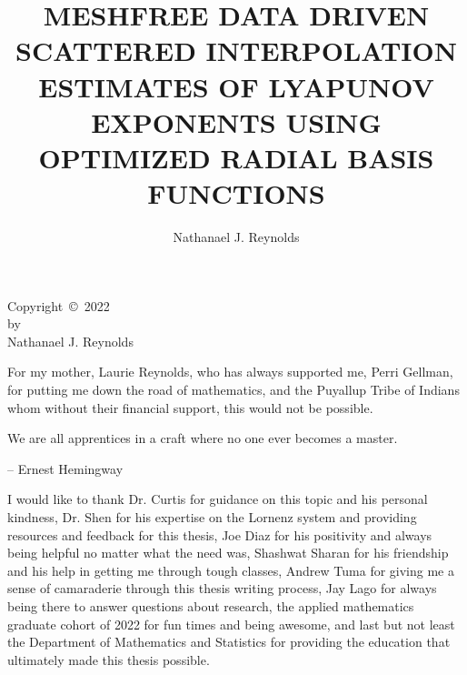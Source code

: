 \documentclass[12pt]{sdsu-thesis}
\author{Nathanael J. Reynolds}
\title{MESHFREE DATA DRIVEN SCATTERED INTERPOLATION ESTIMATES OF LYAPUNOV EXPONENTS USING OPTIMIZED RADIAL BASIS FUNCTIONS}
\theoremstyle{theorem}
\begin{document}
    \justifying
    \maketitle

    \makesignature

    \begin{copyrightpage}
      Copyright~\copyright~2022 \\
      by \\
      Nathanael J. Reynolds
    \end{copyrightpage}

    \begin{dedication}
      \vspace{3in}
      \centering
      For my mother, Laurie Reynolds, who has always supported me, Perri Gellman, for putting me down the road
            of mathematics, and the Puyallup Tribe of Indians whom without their financial support, this would not be possible.
    \end{dedication}

    \begin{epigraph}
      We are all apprentices in a craft where no one ever becomes a master.\\
      \begin{flushright}
        -- Ernest Hemingway
      \end{flushright}
    \end{epigraph}

    \begin{abstract}
      
    \end{abstract}

    \tableofcontents

    \listoftables

    \listoffigures

    \begin{acknowledgments}
      I would like to thank Dr. Curtis for guidance on this topic and his personal
      kindness, Dr. Shen for his expertise on the Lornenz system and
      providing resources and feedback for this thesis,
      Joe Diaz for his positivity and always being helpful no matter what the need was, Shashwat Sharan
      for his friendship and his help in getting me through tough classes,
      Andrew Tuma for giving me a sense of camaraderie through this thesis writing process,
      Jay Lago for always being there to answer questions about research, the
      applied mathematics graduate cohort of 2022 for fun times and being awesome,
      and last but not least the Department of Mathematics and Statistics for
      providing the education that ultimately made this thesis possible.
    \end{acknowledgments}

    
    \nocite{*}
    
    
    
\end{document}
